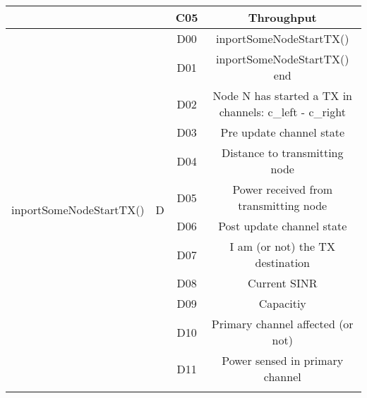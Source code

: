 \documentclass[a4paper]{article}
\begin{document}
\begin{table}[h!]
\begin{tabular}{|c|c|c|c|}
		                                           &                     & C05               & Throughput                                              \\ \hline
		\multirow{14}{*}{inportSomeNodeStartTX()}  & \multirow{14}{*}{D} & D00               & inportSomeNodeStartTX()                                 \\ \cline{3-4} 
		                                           &                     & D01               & inportSomeNodeStartTX() end                             \\ \cline{3-4} 
		                                           &                     & D02               & Node N has started a TX in channels: c\_left - c\_right \\ \cline{3-4} 
		                                           &                     & D03               & Pre update channel state                                \\ \cline{3-4} 
		                                           &                     & D04               & Distance to transmitting node                           \\ \cline{3-4} 
		                                           &                     & D05               & Power received from transmitting node                   \\ \cline{3-4} 
		                                           &                     & D06               & Post update channel state                               \\ \cline{3-4} 
		                                           &                     & D07               & I am (or not) the TX destination                        \\ \cline{3-4} 
		                                           &                     & D08               & Current SINR                                            \\ \cline{3-4} 
		                                           &                     & D09               & Capacitiy                                               \\ \cline{3-4} 
		                                           &                     & D10               & Primary channel affected (or not)                       \\ \cline{3-4} 
		                                           &                     & D11               & Power sensed in primary channel                         \\ \cline{3-4} 

\end{tabular}
\end{table}
\end{document}

